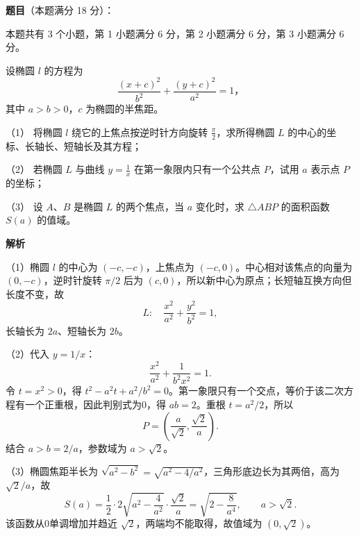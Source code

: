 \begin{answer}

\textbf{题目}（本题满分 18 分）：

本题共有 3 个小题，第 1 小题满分 6 分，第 2 小题满分 6 分，第 3 小题满分 6 分。

设椭圆 $l$ 的方程为
\nopagebreak[4]
\[
\frac{(x+c)^2}{b^2}+\frac{(y+c)^2}{a^2}=1\mbox{，}
\]
其中 $a>b>0$，$c$ 为椭圆的半焦距。

（1） 将椭圆 $l$ 绕它的上焦点按逆时针方向旋转 $\frac\pi2$，求所得椭圆 $L$ 的中心的坐标、长轴长、短轴长及其方程；

（2） 若椭圆 $L$ 与曲线 $y=\frac1x$ 在第一象限内只有一个公共点 $P$，试用 $a$ 表示点 $P$ 的坐标；

（3） 设 $A\text{、}B$ 是椭圆 $L$ 的两个焦点，当 $a$ 变化时，求 $\triangle ABP$ 的面积函数 $S(a)$ 的值域。

\textbf{解析}


（1）椭圆 $l$ 的中心为 $(-c,-c)$，上焦点为 $(-c,0)$。中心相对该焦点的向量为 $(0,-c)$，逆时针旋转 $\pi/2$ 后为 $(c,0)$，所以新中心为原点；长短轴互换方向但长度不变，故
\nopagebreak[4]
\[
L:\quad\frac{x^2}{a^2}+\frac{y^2}{b^2}=1,
\]
长轴长为 $2a$、短轴长为 $2b$。


（2）代入 $y=1/x$：
\nopagebreak[4]
\[
\frac{x^2}{a^2}+\frac{1}{b^2x^2}=1.
\]
令 $t=x^2>0$，得 $t^2-a^2t+a^2/b^2=0$。第一象限只有一个交点，等价于该二次方程有一个正重根，因此判别式为0，得 $ab=2$。重根 $t=a^2/2$，所以
\nopagebreak[4]
\[
P=\left(\frac{a}{\sqrt2},\frac{\sqrt2}{a}\right).
\]
结合 $a>b=2/a$，参数域为 $a>\sqrt2$。


（3）椭圆焦距半长为 $\sqrt{a^2-b^2}=\sqrt{a^2-4/a^2}$，三角形底边长为其两倍，高为 $\sqrt2/a$，故
\nopagebreak[4]
\[
S(a)=\frac12\cdot2\sqrt{a^2-\frac4{a^2}}\cdot\frac{\sqrt2}{a}
=\sqrt{2-\frac8{a^4}},\qquad a>\sqrt2.
\]
该函数从0单调增加并趋近 $\sqrt2$，两端均不能取得，故值域为 $(0,\sqrt2)$。




\end{answer}